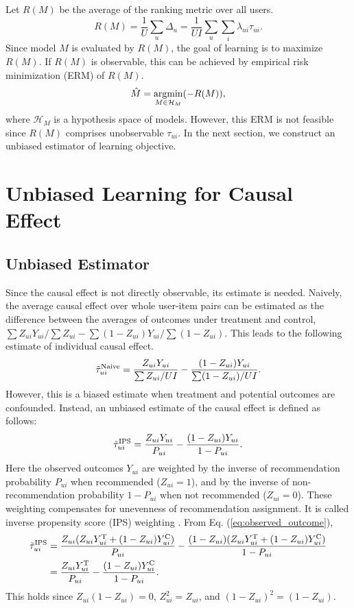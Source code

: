 \documentclass[manuscript,screen]{acmart}
\newcommand{\argmin}{\mathop{\rm argmin}\limits}
\begin{document}
Let $R(M)$ be the average of the ranking metric over all users.
\begin{equation}
R(M) = \frac{1}{U} \sum_u \Delta_u = \frac{1}{UI} \sum_u \sum_i \lambda_{ui} \tau_{ui}.
\end{equation}
Since model $M$ is evaluated by $R(M)$, the goal of learning is to maximize $R(M)$.
If $R(M)$ is observable, this can be achieved by empirical risk minimization (ERM) of $R(M)$.
\begin{equation}
\hat{M} = \argmin_{M \in \mathcal{H}_M} (-R(M)),
\end{equation}
where $\mathcal{H}_M$ is a hypothesis space of models.
However, this ERM is not feasible since $R(M)$ comprises unobservable $\tau_{ui}$.
In the next section, we construct an unbiased estimator of learning objective.

\section{Unbiased Learning for Causal Effect}
\subsection{Unbiased Estimator}
\label{subsec:unbiased_estimator}
Since the causal effect is not directly observable, its estimate is needed.
Naively, the average causal effect over whole user-item pairs can be estimated as the difference between the averages of outcomes under treatment and control, $\sum Z_{ui} Y_{ui}/\sum Z_{ui} - \sum (1-Z_{ui}) Y_{ui}/\sum (1-Z_{ui})$.
This leads to the following estimate of individual causal effect.
\begin{equation}
\label{eq:tau_naive}
\tilde{\tau}_{ui}^{\textnormal{Naive}} = \frac{Z_{ui} Y_{ui}}{\sum Z_{ui}/UI} - \frac{(1-Z_{ui}) Y_{ui}}{\sum (1-Z_{ui})/UI}.
\end{equation}
However, this is a biased estimate when treatment and potential outcomes are confounded.
Instead, an unbiased estimate of the causal effect is defined as follows:
\begin{equation}
\label{eq:tau_IPS}
\tilde{\tau}_{ui}^{\textnormal{IPS}} = \frac{Z_{ui} Y_{ui}}{P_{ui}} - \frac{(1-Z_{ui}) Y_{ui}}{1-P_{ui}}.
\end{equation}
Here the observed outcomes $Y_{ui}$ are weighted by the inverse of recommendation probability $P_{ui}$ when recommended ($Z_{ui}=1$), and by the inverse of non-recommendation probability $1-P_{ui}$ when not recommended ($Z_{ui}=0$).
These weighting compensates for unevenness of recommendation assignment.
It is called inverse propensity score (IPS) weighting \cite{Lunceford04, Hirano03}.
From Eq. (\ref{eq:observed_outcome}),
\begin{align} 
\tilde{\tau}_{ui}^{\textnormal{IPS}}
&= \frac{Z_{ui} (Z_{ui} Y_{ui}^\textnormal{T} + (1-Z_{ui}) Y_{ui}^\textnormal{C})}{P_{ui}} - \frac{(1-Z_{ui}) (Z_{ui} Y_{ui}^\textnormal{T} + (1-Z_{ui}) Y_{ui}^\textnormal{C})}{1-P_{ui}}\nonumber\\
&= \frac{Z_{ui} Y_{ui}^\textnormal{T}}{P_{ui}} - \frac{(1-Z_{ui}) Y_{ui}^\textnormal{C}}{1-P_{ui}}.
\end{align}
This holds since $Z_{ui}(1-Z_{ui}) = 0$, $Z_{ui}^2 = Z_{ui}$, and $(1-Z_{ui})^2 = (1-Z_{ui})$.
\end{document}
